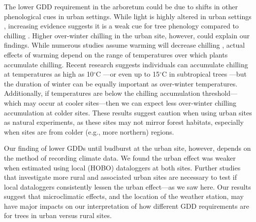 \documentclass{article}\usepackage[]{graphicx}\usepackage[]{color}
\begin{document}
The lower GDD requirement in the arboretum could be due to shifts in other phenological cues in urban settings. While light is highly altered in urban settings \citep{Jochner2015}, increasing evidence suggests it is a weak cue for tree phenology compared to chilling \citep{Ettinger2020}. Higher over-winter chilling in the urban site, however, could explain our findings. While numerous studies assume warming will decrease chilling \citep{Luedeling2011,Fu2015,Asse2018}, actual effects of warming depend on the range of temperatures over which plants accumulate chilling. Recent research suggests individuals can accumulate chilling at temperatures as high as 10$^{\circ}$C \citep{Baumgarten2021}---or even up to 15$^{\circ}$C in subtropical trees \citep{Zhang2021}---but the duration of winter can be equally important as over-winter temperatures. Additionally, if temperatures are below the chilling accumulation threshold---which may occur at cooler sites---then we can expect less over-winter chilling accumulation at colder sites. These results suggest caution when using urban sites as natural experiments, as these sites may not mirror forest habitats, especially when sites are from colder (e.g., more northern) regions. 

Our finding of lower GDDs until budburst at the urban site, however, depends on the method of recording climate data. We found the urban effect was weaker when estimated using local (HOBO) dataloggers at both sites. Further studies that investigate more rural and associated urban sites are necessary to test if local dataloggers consistently lessen the urban effect---as we saw here. Our results suggest that microclimatic effects, and the location of the weather station, may have major impacts on our interpretation of how different GDD requirements are for trees in urban versus rural sites. 
\end{document}
